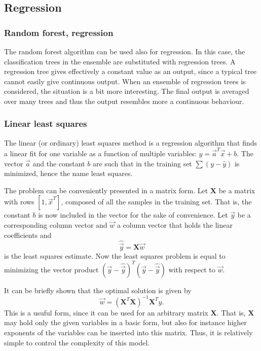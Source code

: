 \documentclass[twoside]{article}
\renewcommand{\v}[1]{\vec{#1}}
\begin{document}
\begin{multicols}{2}
\subsection{Regression}

\subsubsection{Random forest, regression}

The random forest algorithm can be used also for regression. In this case, the classification trees in the 
ensemble are substituted with regression trees. A regression tree gives effectively a constant value as an output,
since a typical tree cannot easily give continuous output. When an ensemble of regression trees is considered, the 
situation is a bit more interesting. The final output is averaged over many trees and thus the output resembles
more a continuous behaviour.

\subsubsection{Linear least squares}\label{method:leastsquare}

The linear (or ordinary) least squares method is a regression algorithm that
finds a linear fit for one variable as a function of multiple variables: $\hat{y} = \v{a}^T \v{x}+b$. 
The vector $\v{a}$ and the constant $b$ are such that in the training set $\sum (y - \hat{y})$ is 
minimized, hence the name least squares.

The problem can be conveniently presented in a matrix form. Let $\mathbf{X}$ be a matrix
with rows $[1, \v{x}^T]$, composed of all the samples in the training set. That is, the 
constant $b$ is now included in the vector for the sake of convenience. Let $\v{y}$ be
a corresponding column vector and $\v{w}$ a column vector that holds the linear coefficients and
\begin{equation}
\hat{\v{y}} = \mathbf{X} \v{w}
\end{equation}
is the least squares estimate. Now the least squares problem is equal to minimizing the
vector product $(\v{y} - \hat{\v{y}})^T(\v{y} - \hat{\v{y}})$ with respect to $\v{w}$. 

It can be briefly shown that the optimal solution is given by 
\begin{equation}
 \v{w} = (\mathbf{X}^T \mathbf{X})^{-1} \mathbf{X}^T y.
\end{equation}
This is a usuful form, since it can be used for an arbitrary matrix $\mathbf{X}$. That is,
$\mathbf{X}$ may hold only the given variables in a basic form, but also for instance higher
exponents of the variables can be inserted into this matrix. Thus, it is relatively simple
to control the complexity of this model.


\end{multicols}
\end{document}
